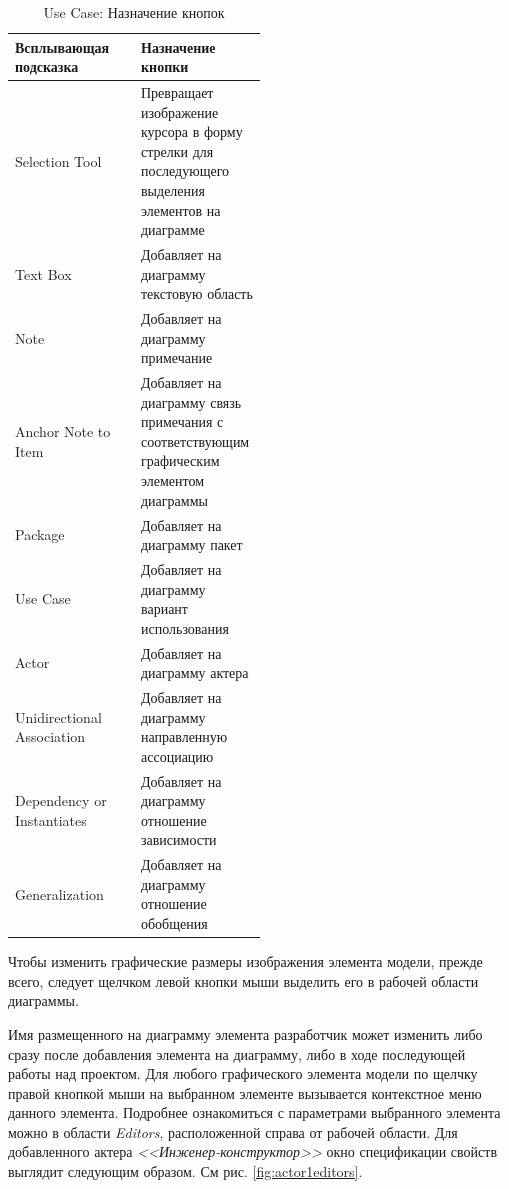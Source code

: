 \documentclass[a4paper,12pt]{extreport}
\begin{document}
\newpage
\begin{table}[htbp]
	
	\begin{center}
		\begin{tabular}{|l|m{0.5\linewidth}|}
		\hline
		\textbf{Всплывающая подсказка} & \textbf{Назначение кнопки} \\ \hline
		Selection Tool & Превращает изображение курсора в форму стрелки для последующего выделения элементов на диаграмме \\ \hline
		Text Box & Добавляет на диаграмму текстовую область \\ \hline
		Note & Добавляет на диаграмму примечание \\ \hline
		Anchor Note to Item & Добавляет на диаграмму связь примечания с соответствующим графическим элементом диаграммы \\ \hline
		Package & Добавляет на диаграмму пакет \\ \hline
		Use Case & Добавляет на диаграмму вариант использования \\ \hline
		Actor & Добавляет на диаграмму актера \\ \hline
		Unidirectional Association & Добавляет на диаграмму направленную ассоциацию \\ \hline
		Dependency or Instantiates & Добавляет на диаграмму отношение зависимости \\ \hline
		Generalization & Добавляет на диаграмму отношение обобщения \\ \hline
	\end{tabular}
	\end{center}
	\label{tab:toolboxusecase}
	\caption{Use Case: Назначение кнопок}
\end{table}
Чтобы изменить графические размеры изображения элемента модели, прежде всего, следует щелчком левой кнопки мыши выделить его в рабочей области диаграммы.

Имя размещенного на диаграмму элемента разработчик может изменить либо сразу после добавления элемента на диаграмму, либо в ходе последующей работы над проектом. Для любого графического элемента модели по щелчку правой кнопкой мыши на выбранном элементе вызывается контекстное меню данного элемента. Подробнее ознакомиться с параметрами выбранного элемента можно в области \textit{Editors}, расположенной справа от рабочей области. Для добавленного актера \textit{<<Инженер-конструктор>>} окно спецификации свойств выглядит следующим образом. См рис. \ref{fig:actor1editors}.
\end{document}

